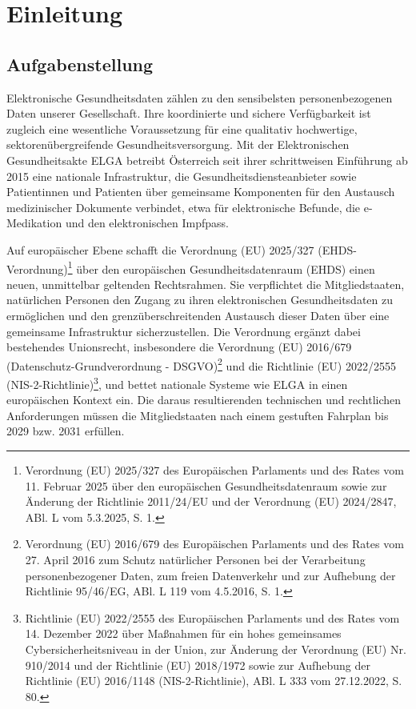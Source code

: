 \chapter{Einleitung}

\section{Aufgabenstellung}
Elektronische Gesundheitsdaten zählen zu den sensibelsten personenbezogenen Daten unserer Gesellschaft. Ihre koordinierte und sichere Verfügbarkeit ist zugleich eine wesentliche Voraussetzung für eine qualitativ hochwertige, sektorenübergreifende Gesundheitsversorgung. Mit der Elektronischen Gesundheitsakte ELGA betreibt Österreich seit ihrer schrittweisen Einführung ab 2015 eine nationale Infrastruktur, die Gesundheitsdiensteanbieter sowie Patientinnen und Patienten über gemeinsame Komponenten für den Austausch medizinischer Dokumente verbindet, etwa für elektronische Befunde, die e-Medikation und den elektronischen Impfpass.

Auf europäischer Ebene schafft die Verordnung (EU) 2025/327 (EHDS-Verordnung)\footnote{Verordnung (EU) 2025/327 des Europäischen Parlaments und des Rates vom 11. Februar 2025 über den europäischen Gesundheitsdatenraum sowie zur  Änderung der Richtlinie 2011/24/EU und der Verordnung (EU) 2024/2847, ABl. L  vom 5.3.2025, S. 1.} über den europäischen Gesundheitsdatenraum (EHDS) einen neuen, unmittelbar geltenden Rechtsrahmen. Sie verpflichtet die Mitgliedstaaten, natürlichen Personen den Zugang zu ihren elektronischen Gesundheitsdaten zu ermöglichen und den grenzüberschreitenden Austausch dieser Daten über eine gemeinsame Infrastruktur sicherzustellen. Die Verordnung ergänzt dabei bestehendes Unionsrecht, insbesondere die Verordnung (EU) 2016/679 (Datenschutz-Grundverordnung - DSGVO)\footnote{Verordnung (EU) 2016/679 des Europäischen Parlaments und des Rates vom 27. April 2016 zum Schutz natürlicher Personen bei der Verarbeitung personenbezogener Daten, zum freien Datenverkehr und zur Aufhebung der Richtlinie 95/46/EG, ABl. L 119 vom 4.5.2016, S. 1.} und die Richtlinie (EU) 2022/2555 (NIS-2-Richtlinie)\footnote{Richtlinie (EU) 2022/2555 des Europäischen Parlaments und des Rates vom 14. Dezember 2022 über Maßnahmen für ein hohes gemeinsames Cybersicherheitsniveau in der Union, zur Änderung der Verordnung (EU) Nr. 910/2014 und der Richtlinie (EU) 2018/1972 sowie zur Aufhebung der Richtlinie (EU) 2016/1148 (NIS-2-Richtlinie), ABl. L 333 vom 27.12.2022, S. 80.}, und bettet nationale Systeme wie ELGA in einen europäischen Kontext ein. Die daraus resultierenden technischen und rechtlichen Anforderungen müssen die Mitgliedstaaten nach einem gestuften Fahrplan bis 2029 bzw. 2031 erfüllen.

